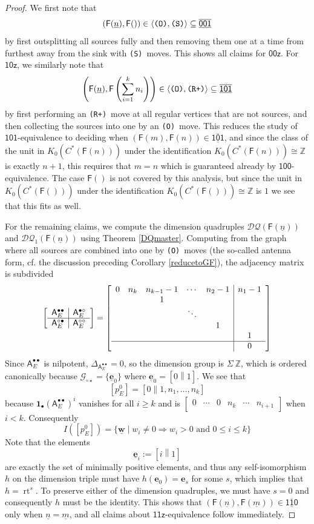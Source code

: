 \documentclass[12pt]{amsbook}%
\newcommand{\lt}{\operatorname{rt}}
\newcommand{\ee}{{\mathbf e}}
\theoremstyle{defin}
\theoremstyle{remark}
\numberwithin{equation}{chapter}
\numberwithin{theor}{section}
\newcommand{\nn}{\underline{n}}
\newcommand{\mm}{\underline{m}}
\newcommand{\ZZ}{\mathbb{Z}}
\newcommand{\xyz}[1]{\mbox{$\mathsf{#1}$}}
\newcommand{\xyzrel}[1]{\mbox{$\overline{\underline{\mathsf{ #1}}}$}}
\newcommand{\OOO}{\mbox{\texttt{\textup{(O)}}}}
\newcommand{\RRRp}{\mbox{\texttt{\textup{(R+)}}}}
\newcommand{\SSS}{\mbox{\texttt{\textup{(S)}}}}
\newcommand{\singgen}{\mathcal G_{\circ\star}}
\newcommand{\DQ}{\mathcal{DQ}}
\newcommand{\DQp}{\mathcal{DQ}_1}
\newcommand{\GF}{{\mathsf F}}
\newcommand{\nsX}{\Sigma\ }
\newcommand{\oXe}[2]{\left[#1\left\|{#2}\right.\right]}
\newcommand{\regX}{{\bullet}}
\newcommand{\uu}{\mathbf{1}}
\newcommand{\www}{\underline{\mathbf w}}
\newcommand{\eee}{\underline{\mathbf e}}
\newcommand{\adjRR}{\mathsf{A}^{\bullet\bullet}}
\newcommand{\adjRS}{\mathsf{A}^{\bullet\circ}}
\newcommand{\adjSR}{\mathsf{A}^{\circ\bullet }}
\newcommand{\adjSS}{\mathsf{A}^{\circ\circ}}
\begin{document}
\begin{proof}
We first note that
\[
(\GF(\nn),\GF())\in\langle \OOO,\SSS\rangle\subseteq \xyzrel{001}
\]
by first outsplitting all sources fully and then removing them one at a time from furthest away from the sink with \SSS\ moves. This shows all claims for $\xyz{00z}$. For $\xyz{10z}$, we similarly note that
\[
\left(\GF(\nn),\GF\left(\sum_{i=1}^kn_i\right)\right)\in\langle \OOO,\RRRp\rangle\subseteq \xyzrel{101}
\]
by first performing an \RRRp\ move at all regular vertices that are not sources,  and then collecting the sources into one by an \OOO\ move. This reduces the study of \xyz{101}-equivalence to deciding  when $(\GF(m),\GF(n))\in\xyzrel{101}$, and since the class of the unit in $K_0(C^*(\GF(n)))$ under the identification $K_0(C^*(\GF(n)))\cong \ZZ$ is exactly $n+1$,  this requires that $m=n$ which is guaranteed already by \xyz{100}-equivalence. The case $\GF()$ is not covered by this analysis, but since the unit in  $K_0(C^*(\GF()))$ under the identification $K_0(C^*(\GF()))\cong \ZZ$ is $1$ we see that this fits as well.


For the remaining claims, we compute the dimension quadruples $\DQ(\GF(\nn))$ and $\DQp(\GF(\nn))$ using Theorem \ref{DQmaster}. 
Computing from the graph where all sources are combined into one by \OOO\ moves (the so-called antenna form, cf. the discussion preceding Corollary \ref{reducetoGF}), the adjacency matrix is subdivided 
\[
\left[\begin{array}{c|c}\adjRR_E&\adjRS_E\\\hline \adjSR_E&\adjSS_E\end{array}\right]=
\left[\begin{array}{ccccc|c}
0&n_k&n_{k-1}-1&\cdots&n_{2}-1&n_{1}-1\\
&&1&&&\\
&&&\ddots&&\\
&&&&1&\\
&&&&&1\\\hline
&&&&&0
\end{array}\right]
\]
Since $\adjRR_E$ is nilpotent, $\Delta_{\adjRR_E}=0$, so the dimension group is $\nsX\ZZ$, which is ordered canonically because $\singgen=\{\eee_0\}$ where $\eee_0=\oXe 01$. We see that
\[
[p_E^0]=\oXe{0}{1,n_1,\dots,n_k}
\]
because $\uu_\regX (\adjRR_E)^i$ vanishes for all $i\geq k$ and is $\begin{bmatrix}0&\cdots&0&n_k&\cdots& n_{i+1}\end{bmatrix}$ when $i<k$. Consequently
\[
I([p_E^0])=\{\www\mid w_i\not=0\Longrightarrow w_i>0\text{ and } 0\leq i\leq k\}
\]
 Note that the elements 
 \[
 \eee_i:=\oXe{i}{1}
 \]
 are exactly the   set of minimally positive elements, and thus any self-isomorphism $h$ on the dimension triple must have $h(\ee_0)=\ee_s$ for some $s$, which implies that $h=\lt^s$. To preserve either of the dimension quadruples, we must have $s=0$ and consequently $h$ must be the identity. This shows that $(\GF(\nn),\GF(\mm))\in \xyzrel{110}$ only when $\nn=\mm$, and all claims about \xyz{11z}-equivalence follow immediately. 


\end{proof}
\end{document}
